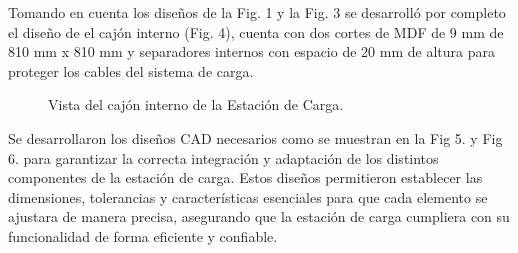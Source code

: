 Tomando en cuenta los diseños de la Fig. 1 y la Fig. 3 se desarrolló por completo el diseño de el cajón interno (Fig. 4), cuenta con dos cortes de MDF de 9 mm de 810 mm x 810 mm y separadores internos con espacio de 20 mm de altura para proteger los cables del sistema de carga. 

        \begin{figure}[htpb]
            \centering
            \caption{Vista del cajón interno de la Estación de Carga.}
            \label{fig:etiqueta}
        \end{figure}


Se desarrollaron los diseños CAD necesarios como se muestran en la Fig 5. y Fig 6. para garantizar la correcta integración y adaptación de los distintos componentes de la estación de carga. Estos diseños permitieron establecer las dimensiones, tolerancias y características esenciales para que cada elemento se ajustara de manera precisa, asegurando que la estación de carga cumpliera con su funcionalidad de forma eficiente y confiable.

